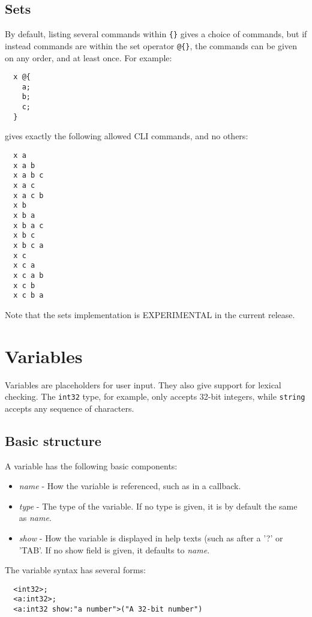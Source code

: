 \documentclass[a4paper, 10pt] {article}
\begin{document}
\subsection{Sets}
\label{sec:sets}
By default, listing several commands within {\tt \{\}} gives a choice of commands, but if instead commands are within the set operator {\tt @\{\}}, the commands can be given on any order, and at least once. For example:
\begin{verbatim}
  x @{
    a;
    b;
    c;
  }
\end{verbatim}

gives exactly the following allowed CLI commands, and no others:
\begin{verbatim}
  x a
  x a b
  x a b c
  x a c
  x a c b
  x b
  x b a
  x b a c
  x b c
  x b c a
  x c
  x c a
  x c a b
  x c b
  x c b a
\end{verbatim}

Note that the sets implementation is EXPERIMENTAL in the current release.

\section{Variables}
\label{sec:variables}
Variables are placeholders for user input. They also give support for
lexical checking. The {\tt int32} type, for example, only
accepts 32-bit integers, while {\tt string} accepts any sequence of
characters. 

\subsection{Basic structure}

A variable has the following basic components:
\begin{itemize}
\item {\em name} - How the variable is referenced, such as in a callback.
\item {\em type} - The type of the variable. If no type is given, it is by default the same as {\em name}.
\item {\em show} - How the variable is displayed in help texts (such as after a '?' or 'TAB'. If no show field is given,  it defaults to {\em name}.
\end{itemize}

The variable syntax has several forms:
\begin{verbatim}
  <int32>;                
  <a:int32>;              
  <a:int32 show:"a number">("A 32-bit number")
\end{verbatim}
\end{document}
